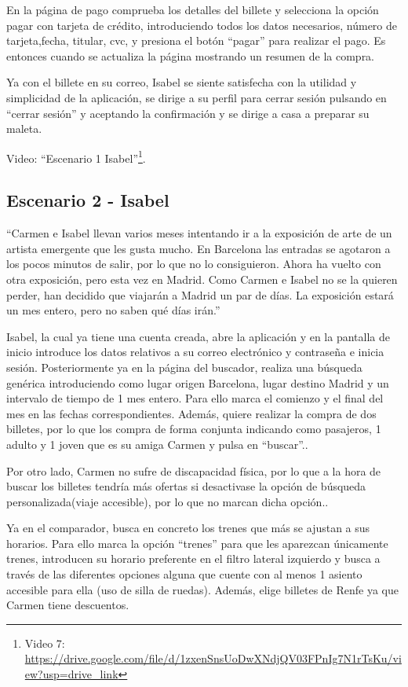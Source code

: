 En la página de pago comprueba los detalles del billete y selecciona la opción pagar con tarjeta de crédito, introduciendo todos los datos necesarios, número de tarjeta,fecha, titular, cvc, y presiona el botón ``pagar'' para realizar el pago. Es entonces cuando se actualiza la página mostrando un resumen de la compra.

Ya con el billete en su correo, Isabel se siente satisfecha con la utilidad y simplicidad de la aplicación, se dirige a su perfil  para cerrar sesión pulsando en ``cerrar sesión'' y aceptando la confirmación y se dirige a casa a preparar su maleta.

Video: ``Escenario 1 Isabel''\footnote{Video 7: \url{https://drive.google.com/file/d/1zxenSnsUoDwXNdjQV03FPnIg7N1rTsKu/view?usp=drive_link}}.


\subsection{Escenario 2 - Isabel}

``Carmen e Isabel llevan varios meses intentando ir a la exposición de arte de un artista emergente que les gusta mucho. En Barcelona las entradas se agotaron a los pocos minutos de salir, por lo que no lo consiguieron. Ahora ha vuelto con otra exposición, pero esta vez en Madrid.
Como Carmen e Isabel no se la quieren perder, han decidido que viajarán a Madrid un par de días. La exposición estará un mes entero, pero no saben qué días irán.''

Isabel, la cual ya tiene una cuenta creada, abre la aplicación y en la pantalla de inicio introduce los datos relativos a su correo electrónico y contraseña e inicia sesión. Posteriormente ya en la página del buscador, realiza una búsqueda genérica introduciendo como lugar origen Barcelona, lugar destino Madrid y un intervalo de tiempo de 1 mes entero. Para ello marca el comienzo y el final del mes en las fechas correspondientes. Además, quiere realizar la compra de dos billetes, por lo que los compra de forma conjunta indicando como pasajeros, 1 adulto y 1 joven que es su amiga Carmen y pulsa en “buscar”.. 


Por otro lado, Carmen no sufre de discapacidad física, por lo que a la hora de buscar los billetes tendría más ofertas si desactivase la opción de búsqueda personalizada(viaje accesible), por lo que no marcan dicha opción..

Ya en el comparador, busca en concreto los trenes que más se ajustan a sus horarios. Para ello marca la opción ``trenes'' para que les aparezcan únicamente trenes, introducen su horario preferente en el filtro lateral izquierdo y busca a través de las diferentes opciones alguna que cuente con al menos 1 asiento accesible para ella (uso de silla de ruedas). Además, elige billetes de Renfe ya que Carmen tiene descuentos. 

